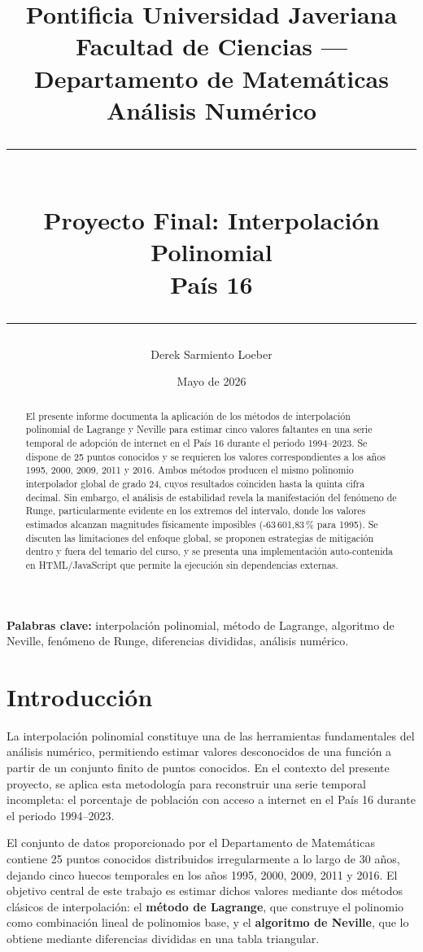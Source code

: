 \documentclass[12pt, letterpaper]{article}
\title{
    \vspace{-1cm}
    {\large \textbf{Pontificia Universidad Javeriana}} \\[0.3cm]
    {\large Facultad de Ciencias --- Departamento de Matemáticas} \\[0.3cm]
    {\large Análisis Numérico} \\[0.8cm]
    \rule{\linewidth}{0.5pt} \\[0.4cm]
    {\LARGE \textbf{Proyecto Final: Interpolación Polinomial}} \\[0.2cm]
    {\Large \textbf{País 16}} \\[0.1cm]
    \rule{\linewidth}{0.5pt}
}
\author{Derek Sarmiento Loeber}
\date{Mayo de 2026}
\begin{document}
\maketitle
\thispagestyle{fancy}

\begin{abstract}
\noindent
El presente informe documenta la aplicación de los métodos de interpolación polinomial de Lagrange y Neville para estimar cinco valores faltantes en una serie temporal de adopción de internet en el País 16 durante el periodo 1994--2023. Se dispone de 25 puntos conocidos y se requieren los valores correspondientes a los años 1995, 2000, 2009, 2011 y 2016. Ambos métodos producen el mismo polinomio interpolador global de grado 24, cuyos resultados coinciden hasta la quinta cifra decimal. Sin embargo, el análisis de estabilidad revela la manifestación del fenómeno de Runge, particularmente evidente en los extremos del intervalo, donde los valores estimados alcanzan magnitudes físicamente imposibles (-63\,601,83\,\% para 1995). Se discuten las limitaciones del enfoque global, se proponen estrategias de mitigación dentro y fuera del temario del curso, y se presenta una implementación auto-contenida en HTML/JavaScript que permite la ejecución sin dependencias externas.
\end{abstract}

\vspace{0.5cm}
\noindent\textbf{Palabras clave:} interpolación polinomial, método de Lagrange, algoritmo de Neville, fenómeno de Runge, diferencias divididas, análisis numérico.

\tableofcontents
\newpage

\section{Introducción}\label{sec:intro}

La interpolación polinomial constituye una de las herramientas fundamentales del análisis numérico, permitiendo estimar valores desconocidos de una función a partir de un conjunto finito de puntos conocidos. En el contexto del presente proyecto, se aplica esta metodología para reconstruir una serie temporal incompleta: el porcentaje de población con acceso a internet en el País 16 durante el periodo 1994--2023.

El conjunto de datos proporcionado por el Departamento de Matemáticas contiene 25 puntos conocidos distribuidos irregularmente a lo largo de 30 años, dejando cinco huecos temporales en los años 1995, 2000, 2009, 2011 y 2016. El objetivo central de este trabajo es estimar dichos valores mediante dos métodos clásicos de interpolación: el \textbf{método de Lagrange}, que construye el polinomio como combinación lineal de polinomios base, y el \textbf{algoritmo de Neville}, que lo obtiene mediante diferencias divididas en una tabla triangular.
\end{document}
